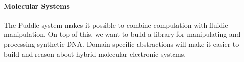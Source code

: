 \documentclass[
  10pt,
  a4paper,
  twocolumn,
]{article}
\begin{document}
\vspace{-0.5em}
\paragraph{Molecular Systems}
The Puddle system makes it possible to combine computation with fluidic manipulation.
On top of this, we want to build a library for manipulating and processing synthetic DNA.
Domain-specific abstractions will make it easier to build and reason about hybrid molecular-electronic systems.







\vfill

\renewcommand*{\bibfont}{\tiny}
\printbibliography[heading=none]
\end{document}

